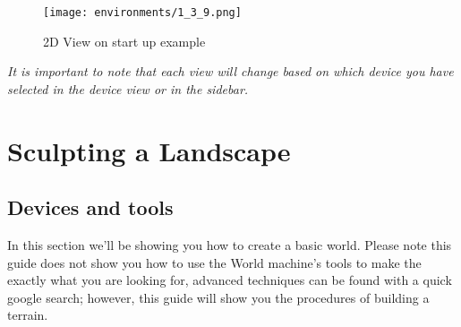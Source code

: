 \documentclass[../main.tex]{subfiles}
\begin{document}
\begin{figure}[H]
\texttt{[image: environments/1\_3\_9.png]}
\caption{2D View on start up example}
\end{figure}
\textit{It is important to note that each view will change based on which device you have selected in the device view or in the sidebar.}

\section{Sculpting a Landscape}
\subsection{Devices and tools}
In this section we’ll be showing you how to create a basic world. Please note this guide does not show you how to use the World machine’s tools to make the exactly what you are looking for, advanced techniques can be found with a quick google search; however, this guide will show you the procedures of building a terrain.
\end{document}
